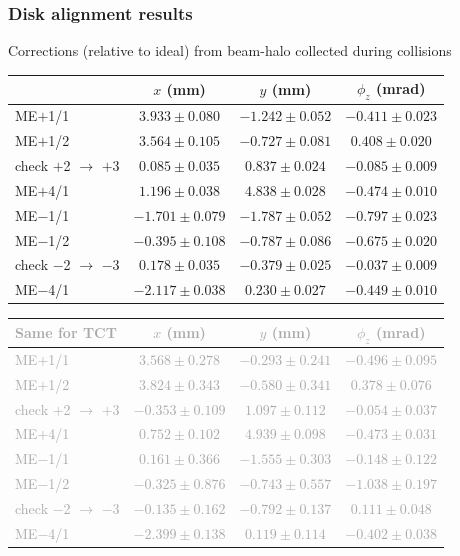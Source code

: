 \documentclass[compress]{beamer}
\begin{document}
\begin{frame}
\frametitle{Disk alignment results}

Corrections (relative to ideal) from beam-halo collected during collisions

\begin{tabular}{l c c c}
 & $x$ (mm) & $y$ (mm) & $\phi_z$ (mrad) \\\hline
ME$+$1/1 & $3.933 \pm 0.080$ & $-1.242 \pm 0.052$ & $-0.411 \pm 0.023$ \\
ME$+$1/2 & $3.564 \pm 0.105$ & $-0.727 \pm 0.081$ & $0.408 \pm 0.020$ \\
check $+$2 $\to$ $+$3 & $0.085 \pm 0.035$ & $0.837 \pm 0.024$ & $-0.085 \pm 0.009$ \\
ME$+$4/1 & $1.196 \pm 0.038$ & $4.838 \pm 0.028$ & $-0.474 \pm 0.010$ \\\hline
ME$-$1/1 & $-1.701 \pm 0.079$ & $-1.787 \pm 0.052$ & $-0.797 \pm 0.023$ \\
ME$-$1/2 & $-0.395 \pm 0.108$ & $-0.787 \pm 0.086$ & $-0.675 \pm 0.020$ \\
check $-$2 $\to$ $-$3 & $0.178 \pm 0.035$ & $-0.379 \pm 0.025$ & $-0.037 \pm 0.009$ \\
ME$-$4/1 & $-2.117 \pm 0.038$ & $0.230 \pm 0.027$ & $-0.449 \pm 0.010$ \\\hline
\end{tabular}

\textcolor{darkgray}{\begin{tabular}{l c c c}
Same for TCT & $x$ (mm) & $y$ (mm) & $\phi_z$ (mrad) \\\hline
ME$+$1/1 & $3.568 \pm 0.278$ & $-0.293 \pm 0.241$ & $-0.496 \pm 0.095$ \\
ME$+$1/2 & $3.824 \pm 0.343$ & $-0.580 \pm 0.341$ & $0.378 \pm 0.076$ \\
check $+$2 $\to$ $+$3 & $-0.353 \pm 0.109$ & $1.097 \pm 0.112$ & $-0.054 \pm 0.037$ \\
ME$+$4/1 & $0.752 \pm 0.102$ & $4.939 \pm 0.098$ & $-0.473 \pm 0.031$ \\\hline
ME$-$1/1 & $0.161 \pm 0.366$ & $-1.555 \pm 0.303$ & $-0.148 \pm 0.122$ \\
ME$-$1/2 & $-0.325 \pm 0.876$ & $-0.743 \pm 0.557$ & $-1.038 \pm 0.197$ \\
check $-$2 $\to$ $-$3 & $-0.135 \pm 0.162$ & $-0.792 \pm 0.137$ & $0.111 \pm 0.048$ \\
ME$-$4/1 & $-2.399 \pm 0.138$ & $0.119 \pm 0.114$ & $-0.402 \pm 0.038$ \\\hline
\end{tabular}}
\end{frame}
\end{document}
